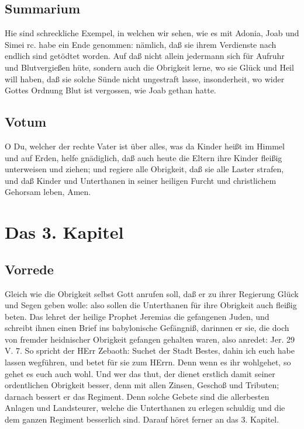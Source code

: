 \section{Summarium}

Hie sind schreckliche Exempel, in welchen wir sehen, wie es mit Adonia, Joab und Simei rc. habe ein Ende genommen: nämlich, daß sie ihrem Verdienste nach endlich sind getödtet worden. Auf daß nicht allein jedermann sich für Aufruhr und Blutvergießen hüte, sondern auch die Obrigkeit lerne, wo sie Glück und Heil will haben, daß sie solche Sünde nicht ungestraft lasse, insonderheit, wo wider Gottes Ordnung Blut ist vergossen, wie Joab gethan hatte.

\section{Votum}

O Du, welcher der rechte Vater ist über alles, was da Kinder heißt im Himmel und auf Erden, helfe gnädiglich, daß auch heute die Eltern ihre Kinder fleißig unterweisen und ziehen; und regiere alle Obrigkeit, daß sie alle Laster strafen, und daß Kinder und Unterthanen in seiner heiligen Furcht und christlichem Gehorsam leben, Amen.

\chapter{Das 3. Kapitel}

\section{Vorrede}

Gleich wie die Obrigkeit selbst Gott anrufen soll, daß er zu ihrer Regierung Glück und Segen geben wolle: also sollen die Unterthanen für ihre Obrigkeit auch fleißig beten. Das lehret der heilige Prophet Jeremias die gefangenen Juden, und schreibt ihnen einen Brief ins babylonische Gefängniß, darinnen er sie, die doch von fremder heidnischer Obrigkeit gefangen gehalten waren, also anredet: Jer. 29 V. 7. So spricht der HErr Zebaoth: Suchet der Stadt Bestes, dahin ich euch habe lassen wegführen, und betet für sie zum HErrn. Denn wenn es ihr wohlgehet, so gehet es euch auch wohl. Und wer das thut, der dienet erstlich damit seiner ordentlichen Obrigkeit besser, denn mit allen Zinsen, Geschoß und Tributen; darnach bessert er das Regiment. Denn solche Gebete sind die allerbesten Anlagen und Landsteurer, welche die Unterthanen zu erlegen schuldig und die dem ganzen Regiment besserlich sind. Darauf höret ferner an das 3. Kapitel.

